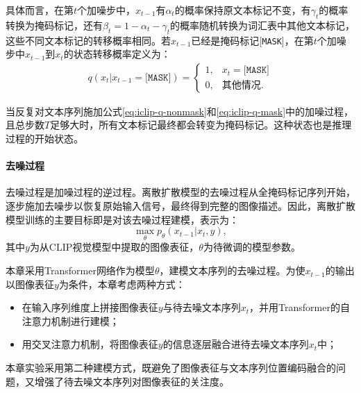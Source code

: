 具体而言，在第$t$个加噪步中，$x_{t-1}$有$\alpha_{t}$的概率保持原文本标记不变，有$\gamma_{t}$的概率转换为掩码标记，还有$\beta_{t}=1-\alpha_{t}-\gamma_{t}$的概率随机转换为词汇表中其他文本标记，这些不同文本标记的转移概率相同。若$x_{t-1}$已经是掩码标记[\texttt{MASK}]，在第$t$个加噪步中$x_{t-1}$到$x_t$的状态转移概率定义为：
\begin{align}
    q(x_t | x_{t - 1} = \texttt{[MASK]}) = 
    \begin{cases}
    1,& x_t =\texttt{[MASK]} \\
    0,& \text{其他情况}.
    \end{cases}
    \label{eq:iclip-q-mask}
\end{align}

当反复对文本序列施加公式\eqref{eq:iclip-q-nonmask}和\eqref{eq:iclip-q-mask}中的加噪过程，且总步数$T$足够大时，所有文本标记最终都会转变为掩码标记。这种状态也是推理过程的开始状态。


\paragraph{去噪过程} 
去噪过程是加噪过程的逆过程。离散扩散模型的去噪过程从全掩码标记序列开始，逐步施加去噪步以恢复原始输入信号，最终得到完整的图像描述。因此，离散扩散模型训练的主要目标即是对该去噪过程建模，表示为：
\begin{equation}
\max_{\theta} p_{\theta}(x_{t-1} | x_{t}, y),
  \label{eq:ddcap-target}
\end{equation}
其中$y$为从CLIP视觉模型中提取的图像表征，$\theta$为待微调的模型参数。

本章采用Transformer\cite{Transformer}网络作为模型$\theta$，建模文本序列的去噪过程。为使$x_{t-1}$的输出以图像表征$y$为条件，本章考虑两种方式：
\begin{itemize}
    \item 在输入序列维度上拼接图像表征$y$与待去噪文本序列$x_{t}$，并用Transformer的自注意力机制进行建模；
    \item 用交叉注意力机制，将图像表征$y$的信息逐层融合进待去噪文本序列$x_{t}$中；
\end{itemize}
本章实验采用第二种建模方式，既避免了图像表征与文本序列位置编码融合的问题，又增强了待去噪文本序列对图像表征的关注度。

